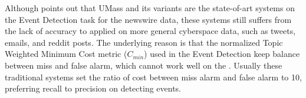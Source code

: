 \documentclass{article}
\begin{document}
Although \cite{Wurzer:2015wq} points out that UMass\cite{Allan:2000wu} and its variants\cite{Petrovic:2010uj}\cite{petrovic2012using}\cite{Wurzer:2015wq} are the state-of-art systems on the Event Detection task for the newswire data, these systems still suffers from the lack of accuracy to applied on more general cyberspace data, such as tweets, emails, and reddit posts. 
The underlying reason is that the normalized Topic Weighted Minimum Cost metric (\(C_{min}\)) used in the Event Detection keep balance between miss and false alarm, which cannot work well on the .
Usually these traditional systems set the ratio of cost between miss alarm and false alarm to 10, preferring recall to precision on detecting events.



\end{document}
